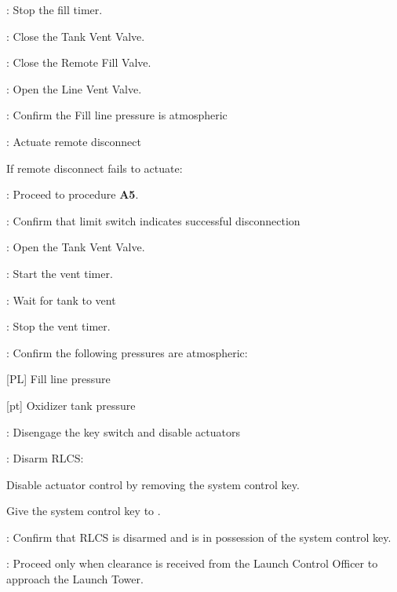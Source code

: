 \begin{checklist}
    \item \ops{}: Stop the fill timer.
    \item \control{}: Close the Tank Vent Valve.
    \item \control{}: Close the Remote Fill Valve.
    \item \control{}: Open the Line Vent Valve.
    \item \control{}: Confirm the Fill line pressure is atmospheric
    \item \control{}: Actuate remote disconnect
        \begin{checklist}[label=$\bullet$]
        \item If remote disconnect fails to actuate:
        \begin{checklist}
            \item \ops{}: Proceed to procedure \textbf{A5}.
        \end{checklist}
    \end{checklist}
    \item \control{}: Confirm that limit switch indicates successful disconnection
    \item \control{}: Open the Tank Vent Valve.
    \item \ops{}: Start the vent timer.
    \item \ops{}: Wait for tank to vent
    \item \ops{}: Stop the vent timer.
    \item \control{}: Confirm the following pressures are atmospheric:
    \begin{checklist}
        \item {[PL]} Fill line pressure
        \item {[pt]} Oxidizer tank pressure
    \end{checklist}
    \item \control{}: Disengage the key switch and disable actuators
    \item \control{}: Disarm RLCS:
    \begin{checklist}
        \item Disable actuator control by removing the system control key.
        \item Give the system control key to \ops{}.
    \end{checklist}
    \item \ops: Confirm that RLCS is disarmed and \ops{} is in possession of the system control  key.
    \item \ops{}: Proceed only when clearance is received from the Launch Control Officer to approach the Launch Tower.

\end{checklist}
